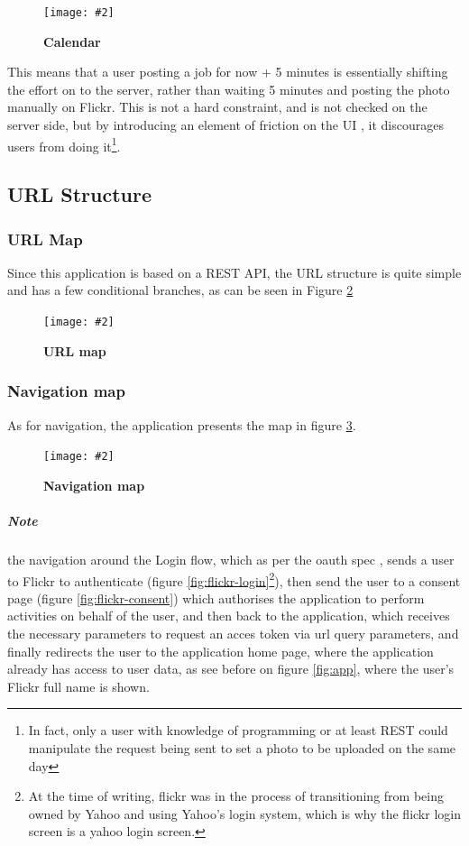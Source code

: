 \documentclass[10pt, a4paper]{article}
\newcommand{\figuremacro}[5]{
\begin{figure}[#1]
\centering
\texttt{[image: \#2]}
\caption[#3]{\textbf{#3}#4}
\label{fig:#2}
\end{figure}
}
\begin{document}
        \figuremacro{h}{time-picker}{Calendar}{}{1.0}

        This means that a user posting a job for now + 5 minutes is essentially shifting the effort on to the server, rather than waiting 5 minutes and posting the photo manually on Flickr.
        This is not a hard constraint, and is not checked on the server side, but by introducing an element of friction on the UI \cite{ui_friction}, it discourages users from doing it\footnote{\label{ft:friction} In fact, only a user with knowledge of programming or at least REST could manipulate the request being sent to set a photo to be uploaded on the same day}.

        \subsection{URL Structure}
        \subsubsection{URL Map}
        Since this application is based on a REST API, the URL structure is quite simple and has a few conditional branches, as can be seen in Figure \ref{fig:url-map}


        \figuremacro{h}{url-map}{URL map}{}{1.0}


        \subsubsection{Navigation map}
        As for navigation, the application presents the map in figure \ref{fig:nav-map}.

        \figuremacro{h}{nav-map}{Navigation map}{}{1.0}


        \subparagraph{Note} the navigation around the Login flow, which as per the oauth spec \cite{oauth}, sends a user to Flickr to authenticate (figure \ref{fig:flickr-login}\footnote{\label{ft:yahoo} At the time of writing, flickr was in the process of transitioning from being owned by Yahoo and using Yahoo's login system, which is why the flickr login screen is a yahoo login screen.}), then send the user to a consent page (figure \ref{fig:flickr-consent}) which authorises the application to perform activities on behalf of the user, and then back to the application, which receives the necessary parameters to request an acces token via url query parameters, and finally redirects the user to the application home page, where the application already has access to user data, as see before on figure \ref{fig:app}, where the user's Flickr full name is shown.
\end{document}
